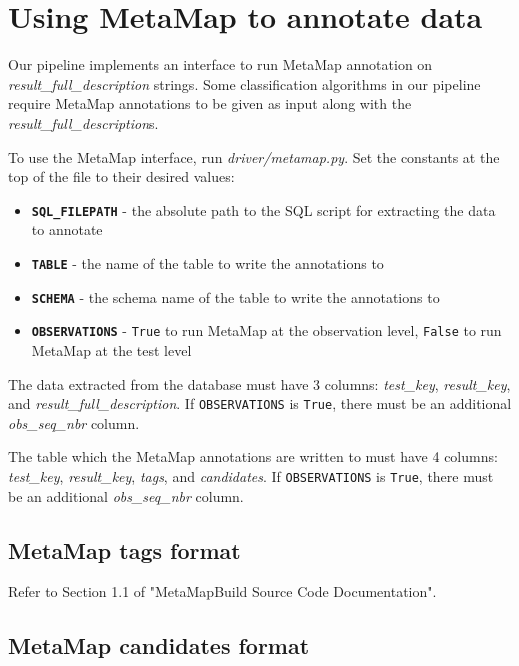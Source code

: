 \documentclass[a4paper]{article}
\begin{document}
\section{Using MetaMap to annotate data}

Our pipeline implements an interface to run MetaMap annotation on \textit{result\_full\_description} strings. Some classification algorithms in our pipeline require MetaMap annotations to be given as input along with the \textit{result\_full\_description}s.

To use the MetaMap interface, run \textit{driver/metamap.py}. Set the constants at the top of the file to their desired values:

\begin{itemize}
\item \textbf{\lstinline{SQL_FILEPATH}} - the absolute path to the SQL script for extracting the data to annotate
\item \textbf{\lstinline{TABLE}} - the name of the table to write the annotations to
\item \textbf{\lstinline{SCHEMA}} - the schema name of the table to write the annotations to
\item \textbf{\lstinline{OBSERVATIONS}} - \lstinline{True} to run MetaMap at the observation level, \lstinline{False} to run MetaMap at the test level
\end{itemize}

The data extracted from the database must have 3 columns: \textit{test\_key}, \textit{result\_key}, and \textit{result\_full\_description}. If \lstinline{OBSERVATIONS} is \lstinline{True}, there must be an additional \textit{obs\_seq\_nbr} column.

The table which the MetaMap annotations are written to must have 4 columns: \textit{test\_key}, \textit{result\_key}, \textit{tags}, and \textit{candidates}. If \lstinline{OBSERVATIONS} is \lstinline{True}, there must be an additional \textit{obs\_seq\_nbr} column.

\subsection{MetaMap tags format}

Refer to Section 1.1 of "MetaMapBuild Source Code Documentation".

\subsection{MetaMap candidates format} \label{metamap_candidates_format}
\end{document}
